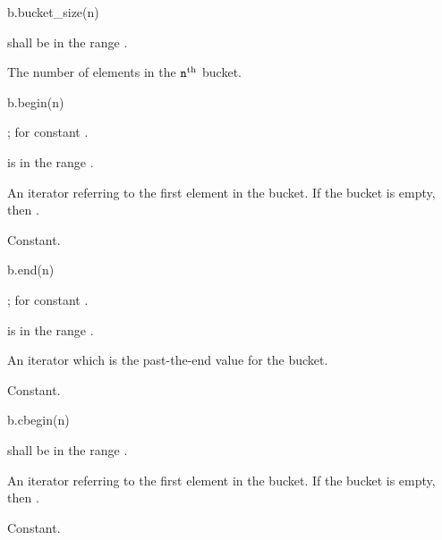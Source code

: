 %
\begin{itemdecl}
b.bucket_size(n)
\end{itemdecl}

\begin{itemdescr}
\pnum
\result
{}

\pnum
\expects
{} shall be in the range .

\pnum
\returns
The number of elements in the $\texttt{\protect n}^\text{th}$ bucket.

\pnum
\complexity
{}
\end{itemdescr}

%
\begin{itemdecl}
b.begin(n)
\end{itemdecl}

\begin{itemdescr}
\pnum
\result
{};  for constant .

\pnum
\expects
{} is in the range .

\pnum
\returns
An iterator referring to the first element in the bucket.
If the bucket is empty, then .

\pnum
\complexity
Constant.
\end{itemdescr}

%
\begin{itemdecl}
b.end(n)
\end{itemdecl}

\begin{itemdescr}
\pnum
\result
{};  for constant .

\pnum
\expects
{} is in the range .

\pnum
\returns
An iterator which is the past-the-end value for the bucket.

\pnum
\complexity
Constant.
\end{itemdescr}

%
\begin{itemdecl}
b.cbegin(n)
\end{itemdecl}

\begin{itemdescr}
\pnum
\result
{}

\pnum
\expects
{} shall be in the range .

\pnum
\returns
An iterator referring to the first element in the bucket.
If the bucket is empty, then .

\pnum
\complexity
Constant.
\end{itemdescr}

